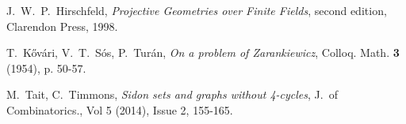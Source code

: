 \documentclass[12pt]{article}
\begin{document}
\begin{thebibliography}{10}

    J.\ W.\ P.\ Hirschfeld,
    {\em Projective Geometries over Finite Fields}, second edition,
    Clarendon Press, 1998.

    T.\ K\H{o}v\'{a}ri, V.\ T.\ S\'{o}s, P.\ Tur\'{a}n,
    {\em On a problem of Zarankiewicz},
    Colloq. Math. {\bf 3} (1954), p. 50-57.


    M.\ Tait, C.\ Timmons,
    {\em Sidon sets and graphs without 4-cycles},
    J.\ of Combinatorics., Vol 5 (2014), Issue 2, 155-165.



\end{thebibliography}
\end{document}
